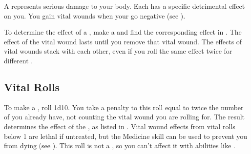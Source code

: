 
  A  represents serious damage to your body.
  Each  has a specific detrimental effect on you.
  You gain vital wounds when your  go negative (see ).

  To determine the effect of a , make a  and find the corresponding effect in .
  The effect of the vital wound lasts until you remove that vital wound.
  The effects of vital wounds stack with each other, even if you roll the same effect twice for different .

  \subsection{Vital Rolls}\label{Vital Rolls}
    To make a , roll 1d10.
    You take a penalty to this roll equal to twice the number of  you already have, not counting the vital wound you are rolling for.
    The result determines the effect of the , as listed in .
    Vital wound effects from vital rolls below 1 are lethal if untreated, but the Medicine skill can be used to prevent you from dying (see ).
    This roll is not a , so you can't affect it with abilities like .

